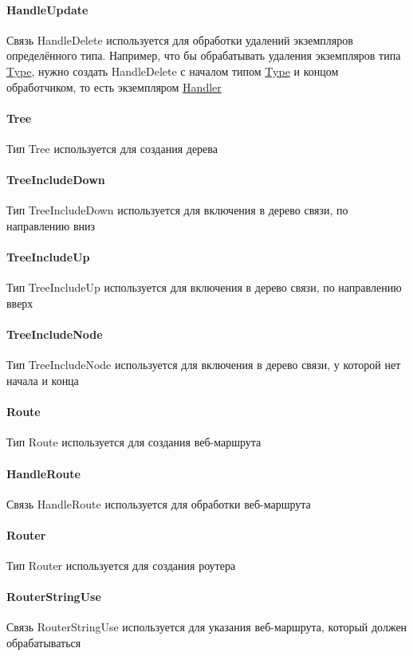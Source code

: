 \documentclass{article}
\begin{document}
\paragraph*{HandleUpdate}
Связь HandleDelete\hypertarget{HandleDelete.Def}{} используется для обработки
удалений экземпляров определённого типа. Например, что бы обрабатывать удаления
экземпляров типа \hyperlink{type.Def}{Type}, нужно создать HandleDelete с
началом типом \hyperlink{type.Def}{Type} и концом обработчиком, то есть
экземпляром \hyperlink{handler.Def}{Handler}
\paragraph*{Tree}
Тип Tree\hypertarget{Tree.Def}{} используется для создания дерева
\paragraph*{TreeIncludeDown}
Тип TreeIncludeDown\hypertarget{TreeIncludeDown.Def}{} используется для
включения в дерево связи, по направлению вниз
\paragraph*{TreeIncludeUp}
Тип TreeIncludeUp\hypertarget{TreeIncludeUp.Def}{} используется для включения в
дерево связи, по направлению вверх
\paragraph*{TreeIncludeNode}
Тип TreeIncludeNode\hypertarget{TreeIncludeNode.Def}{} используется для
включения в дерево связи, у которой нет начала и конца
\paragraph*{Route}
Тип Route\hypertarget{Route.Def}{} используется для создания веб-маршрута
\paragraph*{HandleRoute}
Связь HandleRoute\hypertarget{HandleRoute.Def}{} используется для обработки
веб-маршрута

\paragraph*{Router}
Тип Router\hypertarget{Router.Def}{} используется для создания роутера
\paragraph*{RouterStringUse}
Связь RouterStringUse\hypertarget{RouterStringUse.Def}{} используется для
указания веб-маршрута, который должен обрабатываться
\end{document}
